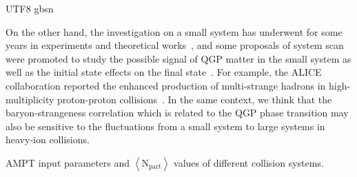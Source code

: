 \documentclass[twocolumn,showpacs,preprintnumbers,amsmath,amssymb]{revtex4-1}
\begin{document}
\begin{CJK*} {UTF8} {gbsn}
	\par
On the other hand, the investigation on a small system has underwent for some years in experiments and theoretical works~\cite{small_sys_LHC,small_sys_1}, and some proposals of system scan were promoted to study the possible signal  of QGP matter in the small system as well as the initial state effects on the final state~\cite{SHuang2020sysScan,PRC2029sysScanLHC,ZHANG2020135366}.
	For example, the ALICE collaboration reported the enhanced production of multi-strange hadrons in high-multiplicity proton-proton collisions~\cite{smallSystemALICE2017}. In the same context, we think that the baryon-strangeness correlation which is related to the QGP phase transition may also be sensitive to the fluctuations from a small system to large systems in heavy-ion collisions.
	
	

	\begin{table*}[]
\scriptsize
\centering
\caption{AMPT input parameters and $\left\langle \mathrm{N_{part}}\right\rangle$ values of different collision systems.}
\label{AMPT_info}


\end{table*}
\end{CJK*}
\end{document}
